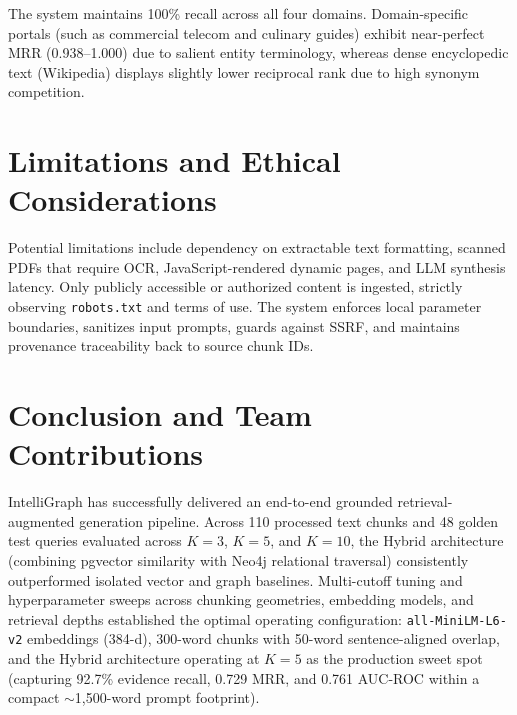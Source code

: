 \documentclass[11pt,a4paper]{article}
\begin{document}
The system maintains 100\% recall across all four domains. Domain-specific portals (such as commercial telecom and culinary guides) exhibit near-perfect MRR (0.938--1.000) due to salient entity terminology, whereas dense encyclopedic text (Wikipedia) displays slightly lower reciprocal rank due to high synonym competition.

\section{Limitations and Ethical Considerations}
Potential limitations include dependency on extractable text formatting, scanned PDFs that require OCR, JavaScript-rendered dynamic pages, and LLM synthesis latency. Only publicly accessible or authorized content is ingested, strictly observing \texttt{robots.txt} and terms of use. The system enforces local parameter boundaries, sanitizes input prompts, guards against SSRF, and maintains provenance traceability back to source chunk IDs.

\section{Conclusion and Team Contributions}
IntelliGraph has successfully delivered an end-to-end grounded retrieval-augmented generation pipeline. Across 110 processed text chunks and 48 golden test queries evaluated across $K=3$, $K=5$, and $K=10$, the Hybrid architecture (combining pgvector similarity with Neo4j relational traversal) consistently outperformed isolated vector and graph baselines. Multi-cutoff tuning and hyperparameter sweeps across chunking geometries, embedding models, and retrieval depths established the optimal operating configuration: \texttt{all-MiniLM-L6-v2} embeddings (384-d), 300-word chunks with 50-word sentence-aligned overlap, and the Hybrid architecture operating at $K=5$ as the production sweet spot (capturing 92.7\% evidence recall, 0.729 MRR, and 0.761 AUC-ROC within a compact $\sim$1,500-word prompt footprint).
\end{document}
